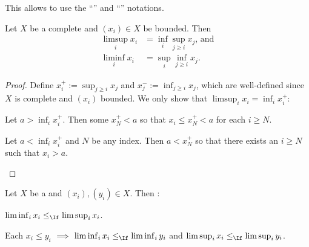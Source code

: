 	\begin{rmk}
		This allows to use the ``'' and ``'' notations.
	\end{rmk}
	
	
	\begin{lem}
		Let $X$ be a complete \LOTS and $(x_i)\in X$ be bounded. Then
		\begin{align*}
			\textstyle \limsup_i x_i & = \textstyle\inf_i \sup_{j\ge i} x_j\text{, and}\\
			\textstyle\liminf_i x_i & = \textstyle\sup_i \inf_{j\ge i} x_j \text{.}
		\end{align*}
	\end{lem}
	
	\begin{proof}
		Define $x_i^+ := \sup_{j\ge i} x_j$ and $x_j^- := \inf_{j\ge i} x_j$, which are well-defined since $X$ is complete and $(x_i)$ bounded. We only show that $\limsup_i x_i = \inf_i x_i^+$:
		\begin{prooflist}
			\item Let $a > \inf_i x_i^+$. Then some $x_N^+ < a$ so that $x_i\le x_N^+ < a$ for each $i\ge N$.
			
			\item Let $a < \inf_i x_i^+$ and $N$ be any index. Then $a < x_N^+$ so that there exists an $i\ge N$ such that $x_i > a$.\qedhere
		\end{prooflist}
	\end{proof}
	
	
	\begin{lem}
		Let $X$ be a \LOTS and $(x_i), (y_i)\in X$. Then \tfh:
		\begin{mylist}
			\item $\liminf_i x_i\le_\If\limsup_i x_i$.
			\item Each $x_i\le y_i$ $\implies$ $\liminf_i x_i\le_\If\liminf_i y_i$ and $\limsup_i x_i\le_\If\limsup_i y_i$.
		\end{mylist}
	\end{lem}
	
